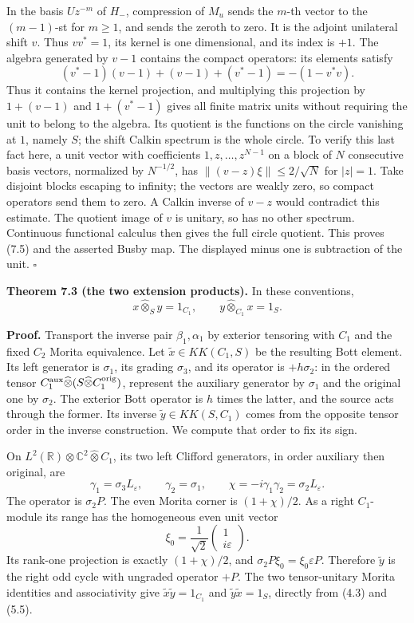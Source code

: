 \documentclass[
  11pt,
]{article}
\begin{document}
In the basis \(Uz^{-m}\) of \(H_-\), compression of \(M_u\) sends the
\(m\)-th vector to the \((m-1)\)-st for \(m\geq1\), and sends the zeroth
to zero. It is the adjoint unilateral shift \(v\). Thus \(vv^*=1\), its
kernel is one dimensional, and its index is \(+1\). The algebra
generated by \(v-1\) contains the compact operators: its elements
satisfy \[
(v^*-1)(v-1)+(v-1)+(v^*-1)=-(1-v^*v).
\] Thus it contains the kernel projection, and multiplying this
projection by \(1+(v-1)\) and \(1+(v^*-1)\) gives all finite matrix
units without requiring the unit to belong to the algebra. Its quotient
is the functions on the circle vanishing at \(1\), namely \(S\); the
shift Calkin spectrum is the whole circle. To verify this last fact
here, a unit vector with coefficients \(1,z,\ldots,z^{N-1}\) on a block
of \(N\) consecutive basis vectors, normalized by \(N^{-1/2}\), has
\(\|(v-z)\xi\|\leq 2/\sqrt N\) for \(|z|=1\). Take disjoint blocks
escaping to infinity; the vectors are weakly zero, so compact operators
send them to zero. A Calkin inverse of \(v-z\) would contradict this
estimate. The quotient image of \(v\) is unitary, so has no other
spectrum. Continuous functional calculus then gives the full circle
quotient. This proves (7.5) and the asserted Busby map. The displayed
minus one is subtraction of the unit. \(\square\)

\textbf{Theorem 7.3 (the two extension products).} In these conventions,
\[
x\widehat\otimes_S y=1_{C_1},\qquad
y\widehat\otimes_{C_1}x=1_S.
\tag{7.7}
\]

\textbf{Proof.} Transport the inverse pair \(\beta_1,\alpha_1\) by
exterior tensoring with \(C_1\) and the fixed \(C_2\) Morita
equivalence. Let \(\widetilde x\in KK(C_1,S)\) be the resulting Bott
element. Its left generator is \(\sigma_1\), its grading \(\sigma_3\),
and its operator is \(+h\sigma_2\): in the ordered tensor
\(C_1^{\rm aux}\widehat\otimes(S\widehat\otimes C_1^{\rm orig})\),
represent the auxiliary generator by \(\sigma_1\) and the original one
by \(\sigma_2\). The exterior Bott operator is \(h\) times the latter,
and the source acts through the former. Its inverse
\(\widetilde y\in KK(S,C_1)\) comes from the opposite tensor order in
the inverse construction. We compute that order to fix its sign.

On \(L^2(\mathbb R)\otimes\mathbb C^2\widehat\otimes C_1\), its two left
Clifford generators, in order auxiliary then original, are \[
\gamma_1=\sigma_3L_\varepsilon,\qquad
\gamma_2=\sigma_1,\qquad
\chi=-i\gamma_1\gamma_2=\sigma_2L_\varepsilon.
\] The operator is \(\sigma_2P\). The even Morita corner is
\((1+\chi)/2\). As a right \(C_1\)-module its range has the homogeneous
even unit vector \[
\xi_0=\frac1{\sqrt2}
\begin{pmatrix}1\\ i\varepsilon\end{pmatrix}.
\] Its rank-one projection is exactly \((1+\chi)/2\), and
\(\sigma_2P\xi_0=\xi_0\varepsilon P\). Therefore \(\widetilde y\) is the
right odd cycle with ungraded operator \(+P\). The two tensor-unitary
Morita identities and associativity give
\(\widetilde x\widetilde y=1_{C_1}\) and
\(\widetilde y\widetilde x=1_S\), directly from (4.3) and (5.5).
\end{document}

